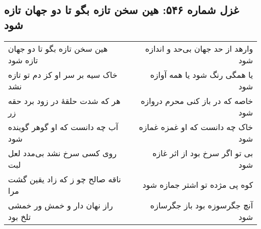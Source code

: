 \begin{center}
\section*{غزل شماره ۵۴۶: هین سخن تازه بگو تا دو جهان تازه شود}
\label{sec:0546}
\begin{longtable}{l p{0.5cm} r}
هین سخن تازه بگو تا دو جهان تازه شود
&&
وارهد از حد جهان بی‌حد و اندازه شود
\\
خاک سیه بر سر او کز دم تو تازه نشد
&&
یا همگی رنگ شود یا همه آوازه شود
\\
هر که شدت حلقهٔ در زود برد حقه زر
&&
خاصه که در باز کنی محرم دروازه شود
\\
آب چه دانست که او گوهر گوینده شود
&&
خاک چه دانست که او غمزه غمازه شود
\\
روی کسی سرخ نشد بی‌مدد لعل لبت
&&
بی تو اگر سرخ بود از اثر غازه شود
\\
ناقه صالح چو ز که زاد یقین گشت مرا
&&
کوه پی مژده تو اشتر جمازه شود
\\
راز نهان دار و خمش ور خمشی تلخ بود
&&
آنچ جگرسوزه بود باز جگرسازه شود
\\
\end{longtable}
\end{center}
